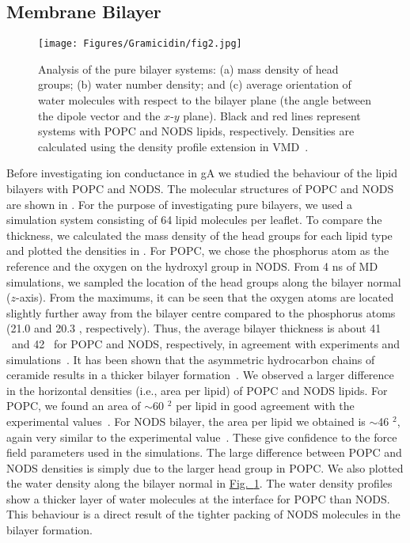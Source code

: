 \subsection{Membrane Bilayer}
\begin{figure}[b!]
\centering
\texttt{[image: Figures/Gramicidin/fig2.jpg]}
\caption{Analysis of the pure bilayer systems: (a) mass density of head groups; (b) water number 
density; and (c) average orientation of water molecules with respect to the bilayer plane (the 
angle between the dipole vector and the $x$-$y$ plane). Black and red lines represent systems with 
POPC and NODS lipids, respectively. Densities are calculated using the density profile extension 
in VMD~\cite{Giorgino2014a}.}
\label{gA:fig2}
\end{figure}
Before investigating ion conductance in gA we studied the behaviour of the lipid bilayers with
POPC and NODS. The molecular structures of POPC and NODS are shown in . For the 
purpose of investigating pure bilayers, we used a simulation system consisting of 64 lipid molecules 
per leaflet. To compare the thickness, we calculated the mass density of the head groups for each 
lipid type and plotted the densities in . For POPC, we chose the phosphorus atom 
as the reference and the oxygen on the hydroxyl group in NODS. From 4 ns of MD simulations, we 
sampled the location of the head groups along the bilayer normal ($z$-axis). From the maximums, 
it can be seen that the oxygen atoms are located slightly further away from the bilayer centre 
compared to the phosphorus atoms (21.0 and 20.3 \angs, respectively). Thus, the average bilayer 
thickness is about 41 \angs\ and 42 \angs\ for POPC and NODS, respectively, in agreement with 
experiments and simulations~\cite{Dutagaci2014a,Kucerka2011}. It has been shown that the asymmetric 
hydrocarbon chains of ceramide results in a thicker bilayer formation~\cite{Carrer}. We observed a 
larger difference in the horizontal densities (i.e., area per lipid) of POPC and NODS lipids. For 
POPC, we found an area of $\sim$60 \angs$^2$ per lipid in good agreement with the experimental 
values~\cite{Jurkiewicz2012a}. For NODS bilayer, the area per lipid we obtained is 
$\sim$46 \angs$^2$, again very similar to the experimental value~\cite{Paloncyova2015}. These give 
confidence to the force field parameters used in the simulations. The large difference between POPC 
and NODS densities is simply due to the larger head group in POPC. We also plotted the water density 
along the bilayer normal in \hyperref[gA:fig2]{Fig.~\ref{gA:fig2}}. The water density profiles show 
a thicker layer of water molecules at the interface for POPC than NODS. This behaviour is a direct 
result of the tighter packing of NODS molecules in the bilayer formation.

